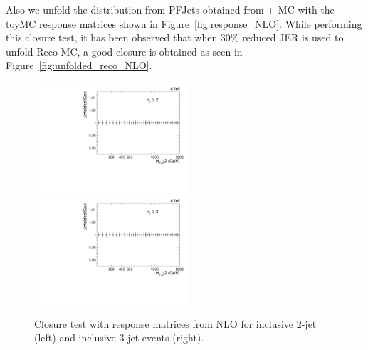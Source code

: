 Also we unfold the distribution from PFJets obtained from \MadGraphF + \PYTHIAS MC with the toyMC response matrices shown in 
Figure~\ref{fig:response_NLO}. While performing this closure test, it has been observed that when 30\% reduced JER is used to unfold \MadGraphF \plus \PYTHIAS Reco MC, a good closure is obtained as seen in  Figure~\ref{fig:unfolded_reco_NLO}.

\begin{figure}[h]
 \begin{center}
 \includegraphics[width=0.51\textwidth]{Plots_HT_2_150/Ratio_Unfolding_NLO_2_funcI.pdf}%
 ~~\includegraphics[width=0.51\textwidth]{Plots_HT_2_150/Ratio_Unfolding_NLO_3_funcI.pdf}
 \caption{Closure test with response matrices from NLO for inclusive 2-jet (left) and inclusive 3-jet events (right).}
 \label{fig:unfolded_smeared}
 \end{center}
\end{figure}

